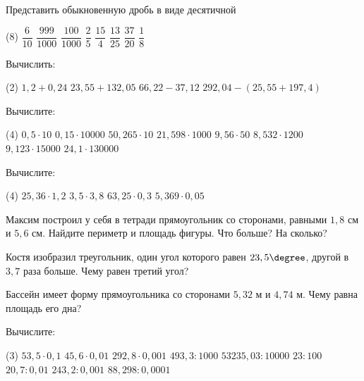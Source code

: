 \begin{class}[number=2]
	\begin{listofex}
		\item Представить обыкновенную дробь в виде десятичной
		\begin{tasks}(8)
			\task \( \dfrac{6}{10} \)
			\task \( \dfrac{999}{1000} \)
			\task \( \dfrac{100}{1000} \)
			\task \( \dfrac{2}{5} \)
			\task \( \dfrac{15}{4} \)
			\task \( \dfrac{13}{25} \)
			\task \( \dfrac{37}{20} \)
			\task \( \dfrac{1}{8} \)
		\end{tasks}
		\item Вычислить:
		\begin{tasks}(2)
			\task \( 1,2+0,24 \)
			\task \( 23,55+132,05 \)
			\task \( 66,22-37,12 \)
			\task \( 292,04-(25,55+197,4) \)
		\end{tasks}
		\item Вычислите:
		\begin{tasks}(4)
			\task \( 0,5\cdot10 \)
			\task \( 0,15\cdot10000 \)
			\task \( 50,265\cdot10 \)
			\task \( 21,598\cdot1000 \)
			\task \( 9,56\cdot50 \)
			\task \( 8,532\cdot1200 \)
			\task \( 9,123\cdot15000 \)
			\task \( 24,1\cdot130000 \)
		\end{tasks}
		\item Вычислите:
		\begin{tasks}(4)
			\task \( 25,36\cdot1,2 \)
			\task \( 3,5\cdot3,8 \)
			\task \( 63,25\cdot0,3 \)
			\task \( 5,369\cdot0,05 \)
		\end{tasks}
		\item Максим построил у себя в тетради прямоугольник со сторонами, равными \( 1,8 \) см и \( 5,6 \) см. Найдите периметр и площадь фигуры. Что больше? На сколько?
		\item Костя изобразил треугольник, один угол которого равен \( 23,5\degree \), другой в \( 3,7 \) раза больше. Чему равен третий угол?
		\item Бассейн имеет форму прямоугольника со сторонами \( 5,32 \) м и \( 4,74 \) м. Чему равна площадь его дна?
		\item Вычислите:
		\begin{tasks}(3)
			\task \( 53,5\cdot0,1 \)
			\task \( 45,6\cdot0,01 \)
			\task \( 292,8\cdot0,001 \)
			\task \( 493,3:1000 \)
			\task \( 53235,03:10000 \)
			\task \( 23:100 \)
			\task \( 20,7:0,01 \)
			\task \( 243,2:0,001 \)
			\task \( 88,298:0,0001 \)
		\end{tasks}
	\end{listofex}

\end{class}
